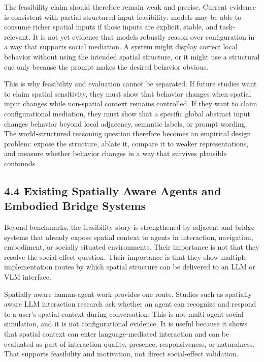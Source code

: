 \documentclass[
  twocolumn]{article}
\begin{document}
The feasibility claim should therefore remain weak and precise. Current
evidence is consistent with partial structured-input feasibility: models
may be able to consume richer spatial inputs if those inputs are
explicit, stable, and task-relevant. It is not yet evidence that models
robustly reason over configuration in a way that supports social
mediation. A system might display correct local behavior without using
the intended spatial structure, or it might use a structural cue only
because the prompt makes the desired behavior obvious.

This is why feasibility and evaluation cannot be separated. If future
studies want to claim spatial sensitivity, they must show that behavior
changes when spatial input changes while non-spatial context remains
controlled. If they want to claim configurational mediation, they must
show that a specific global abstract input changes behavior beyond local
adjacency, semantic labels, or prompt wording. The world-structured
reasoning question therefore becomes an empirical design problem: expose
the structure, ablate it, compare it to weaker representations, and
measure whether behavior changes in a way that survives plausible
confounds.

\subsection{4.4 Existing Spatially Aware Agents and Embodied Bridge
Systems}\label{existing-spatially-aware-agents-and-embodied-bridge-systems}

Beyond benchmarks, the feasibility story is strengthened by adjacent and
bridge systems that already expose spatial context to agents in
interaction, navigation, embodiment, or socially situated environments.
Their importance is not that they resolve the social-effect question.
Their importance is that they show multiple implementation routes by
which spatial structure can be delivered to an LLM or VLM interface.

Spatially aware human-agent work provides one route. Studies such as
spatially aware LLM interaction research ask whether an agent can
recognize and respond to a user's spatial context during conversation.
This is not multi-agent social simulation, and it is not configurational
evidence. It is useful because it shows that spatial context can enter
language-mediated interaction and can be evaluated as part of
interaction quality, presence, responsiveness, or naturalness. That
supports feasibility and motivation, not direct social-effect
validation.
\end{document}
